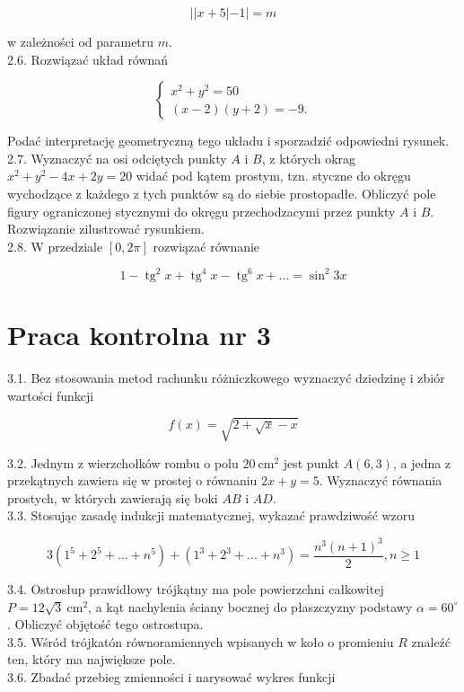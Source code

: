 \documentclass[10pt]{article}
\begin{document}
$$
||x+5|-1|=m
$$

w zależności od parametru $m$.\\
2.6. Rozwiązać układ równań

$$
\left\{\begin{array}{l}
x^{2}+y^{2}=50 \\
(x-2)(y+2)=-9 .
\end{array}\right.
$$

Podać interpretację geometryczną tego układu i sporzadzić odpowiedni rysunek.\\
2.7. Wyznaczyć na osi odciętych punkty $A$ i $B$, z których okrag $x^{2}+y^{2}-4 x+2 y=20$ widać pod kątem prostym, tzn. styczne do okręgu wychodzące z każdego z tych punktów są do siebie prostopadłe. Obliczyć pole figury ograniczonej stycznymi do okręgu przechodzacymi przez punkty $A$ i $B$. Rozwiązanie zilustrować rysunkiem.\\
2.8. W przedziale $[0,2 \pi]$ rozwiązać równanie

$$
1-\operatorname{tg}^{2} x+\operatorname{tg}^{4} x-\operatorname{tg}^{6} x+\ldots=\sin ^{2} 3 x
$$

\section*{Praca kontrolna nr 3}
3.1. Bez stosowania metod rachunku różniczkowego wyznaczyć dziedzinę i zbiór wartości funkcji

$$
f(x)=\sqrt{2+\sqrt{x}-x}
$$

3.2. Jednym z wierzchołków rombu o polu $20 \mathrm{~cm}^{2}$ jest punkt $A(6,3)$, a jedna z przekątnych zawiera się w prostej o równaniu $2 x+y=5$. Wyznaczyć równania prostych, w których zawierają się boki $A B$ i $A D$.\\
3.3. Stosując zasadę indukcji matematycznej, wykazać prawdziwość wzoru

$$
3\left(1^{5}+2^{5}+\ldots+n^{5}\right)+\left(1^{3}+2^{3}+\ldots+n^{3}\right)=\frac{n^{3}(n+1)^{3}}{2}, n \geq 1
$$

3.4. Ostrosłup prawidłowy trójkątny ma pole powierzchni całkowitej $P=12 \sqrt{3} \mathrm{~cm}^{2}$, a kąt nachylenia ściany bocznej do płaszczyzny podstawy $\alpha=60^{\circ}$. Obliczyć objętość tego ostrostupa.\\
3.5. Wśród trójkatón równoramiennych wpisanych w koło o promieniu $R$ znaleźć ten, który ma największe pole.\\
3.6. Zbadać przebieg zmienności i narysować wykres funkcji
\end{document}
